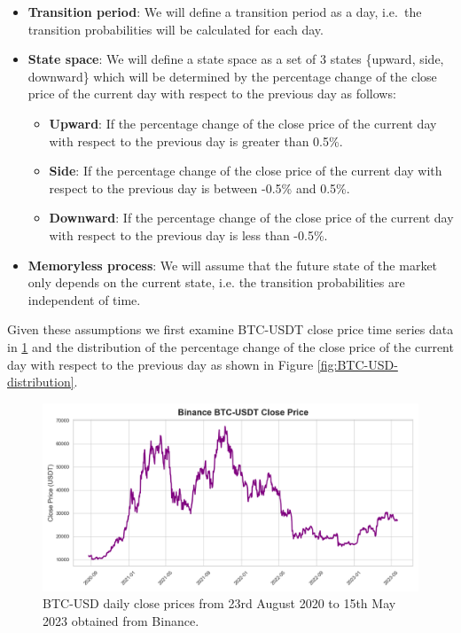 \begin{itemize}
\item [1)] \textbf{Transition period}: We will define a transition period as a day, i.e.\ the transition probabilities will be calculated for each day.
\item [2)] \textbf{State space}: We will define a state space as a set of 3 states \{upward, side, downward\} which will be determined by the percentage change of the close price of the current day with respect to the previous day as follows:
    \begin{itemize}
    \item [a)] \textbf{Upward}: If the percentage change of the close price of the current day with respect to the previous day is greater than 0.5\%.
    \item [b)] \textbf{Side}: If the percentage change of the close price of the current day with respect to the previous day is between -0.5\% and 0.5\%.
    \item [c)] \textbf{Downward}: If the percentage change of the close price of the current day with respect to the previous day is less than -0.5\%.
    \end{itemize}
\item [3)] \textbf{Memoryless process}: We will assume that the future state of the market only depends on the current state, i.e. the transition probabilities are independent of time.
\end{itemize}

Given these assumptions we first examine BTC-USDT close price time series data in \ref{fig:BTC-USD} and the distribution of the percentage change of the close price of the current day with respect to the previous day as shown in Figure \ref{fig:BTC-USD-distribution}.

\begin{figure}[htbp]
    \begin{center}
        \includegraphics[width=1.0\textwidth]{Figs/BTC-USD.png}
        \caption{BTC-USD daily close prices from 23rd August 2020 to 15th May 2023 obtained from Binance. \cite{tradingview}}
        \label{fig:BTC-USD}
    \end{center}
\end{figure}

